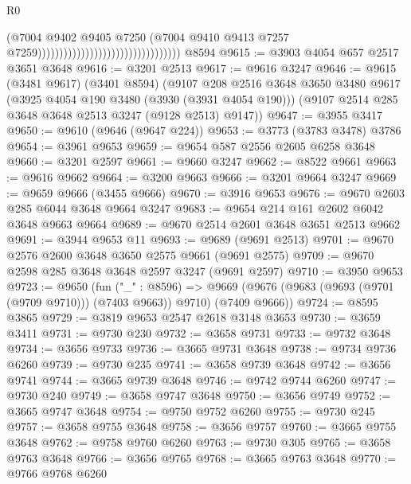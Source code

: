 \begin{lexlean}{R0}
\begin{coremodule}
                                                                  (@7004
                                                                    @9402
                                                                    @9405
                                                                    @7250
                                                                    (@7004
                                                                      @9410
                                                                      @9413
                                                                      @7257
                                                                      @7259)))))))))))))))))))))))))))))))))
    @8594
@9615 := @3903 @4054 @657 @2517 @3651 @3648
@9616 := @3201 @2513
@9617 := @9616 @3247
@9646 := @9615
    (@3481 @9617)
    (@3401 @8594)
    (@9107
      @208
      @2516
      @3648
      @3650
      @3480
      @9617
      (@3925 @4054 @190 @3480 (@3930 (@3931 @4054 @190)))
      (@9107 @2514 @285 @3648 @3648 @2513 @3247 (@9128 @2513) @9147))
@9647 := @3955 @3417
@9650 := @9610 (@9646 (@9647 @224))
@9653 := @3773 (@3783 @3478) @3786
@9654 := @3961 @9653
@9659 := @9654 @587 @2556 @2605 @6258 @3648
@9660 := @3201 @2597
@9661 := @9660 @3247
@9662 := @8522 @9661
@9663 := @9616 @9662
@9664 := @3200 @9663
@9666 := @3201 @9664 @3247
@9669 := @9659 @9666 (@3455 @9666)
@9670 := @3916 @9653
@9676 := @9670 @2603 @285 @6044 @3648 @9664 @3247
@9683 := @9654 @214 @161 @2602 @6042 @3648 @9663 @9664
@9689 := @9670 @2514 @2601 @3648 @3651 @2513 @9662
@9691 := @3944 @9653 @11
@9693 := @9689 (@9691 @2513)
@9701 := @9670 @2576 @2600 @3648 @3650 @2575 @9661 (@9691 @2575)
@9709 := @9670 @2598 @285 @3648 @3648 @2597 @3247 (@9691 @2597)
@9710 := @3950 @9653
@9723 := @9650
    (fun ("_" : @8596) =>
    @9669 (@9676 (@9683 (@9693 (@9701 (@9709 @9710))) (@7403 @9663)) @9710) (@7409 @9666))
@9724 := @8595 @3865
@9729 := @3819 @9653 @2547 @2618 @3148 @3653
@9730 := @3659 @3411
@9731 := @9730 @230
@9732 := @3658 @9731
@9733 := @9732 @3648
@9734 := @3656 @9733
@9736 := @3665 @9731 @3648
@9738 := @9734 @9736 @6260
@9739 := @9730 @235
@9741 := @3658 @9739 @3648
@9742 := @3656 @9741
@9744 := @3665 @9739 @3648
@9746 := @9742 @9744 @6260
@9747 := @9730 @240
@9749 := @3658 @9747 @3648
@9750 := @3656 @9749
@9752 := @3665 @9747 @3648
@9754 := @9750 @9752 @6260
@9755 := @9730 @245
@9757 := @3658 @9755 @3648
@9758 := @3656 @9757
@9760 := @3665 @9755 @3648
@9762 := @9758 @9760 @6260
@9763 := @9730 @305
@9765 := @3658 @9763 @3648
@9766 := @3656 @9765
@9768 := @3665 @9763 @3648
@9770 := @9766 @9768 @6260

\end{coremodule}
\end{lexlean}
